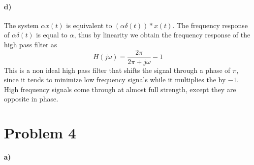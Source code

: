 \documentclass[12pt]{article}
\begin{document}
\paragraph{d)}

The system \(\alpha x(t)\) is equivalent to \((\alpha\delta(t))*x(t)\). The frequency response of \(\alpha\delta(t)\) is equal to \(\alpha\), thus by linearity we obtain the frequency response of the high pass filter as
\[H(j\omega)=\frac{2\pi}{2\pi+j\omega}-1\]
This is a non ideal high pass filter that shifts the signal through a phase of \(\pi\), since it tends to minimize low frequency signals while it multiplies the by \(-1\). High frequency signals come through at almost full
strength, except they are opposite in phase.

\section*{Problem 4}

\paragraph{a)}
\end{document}
